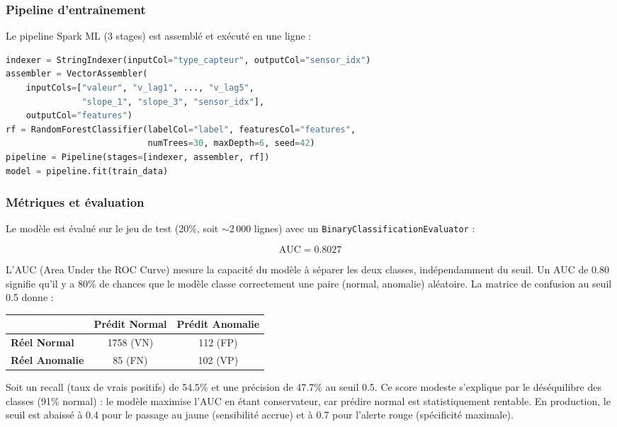 \documentclass[12pt,a4paper]{article}
\begin{document}
\subsubsection{Pipeline d'entraînement}

Le pipeline Spark ML (3 stages) est assemblé et exécuté en une ligne :

\begin{lstlisting}[language=Python,caption={Pipeline d'entraînement (train\_model.py)},label={lst:pipeline}]
indexer = StringIndexer(inputCol="type_capteur", outputCol="sensor_idx")
assembler = VectorAssembler(
    inputCols=["valeur", "v_lag1", ..., "v_lag5",
               "slope_1", "slope_3", "sensor_idx"],
    outputCol="features")
rf = RandomForestClassifier(labelCol="label", featuresCol="features",
                            numTrees=30, maxDepth=6, seed=42)
pipeline = Pipeline(stages=[indexer, assembler, rf])
model = pipeline.fit(train_data)
\end{lstlisting}

\subsubsection{Métriques et évaluation}

Le modèle est évalué sur le jeu de test (20\%, soit $\sim$2\,000 lignes) avec un \texttt{BinaryClassificationEvaluator} :

\[
\text{AUC} = 0.8027
\]

L'AUC (Area Under the ROC Curve) mesure la capacité du modèle à séparer les deux classes, indépendamment du seuil. Un AUC de 0.80 signifie qu'il y a 80\% de chances que le modèle classe correctement une paire (normal, anomalie) aléatoire. La matrice de confusion au seuil 0.5 donne :

\begin{center}
\begin{tabular}{|l|c|c|}
\hline
 & \textbf{Prédit Normal} & \textbf{Prédit Anomalie} \\
\hline
\textbf{Réel Normal} & 1758 (VN) & 112 (FP) \\
\textbf{Réel Anomalie} & 85 (FN) & 102 (VP) \\
\hline
\end{tabular}
\end{center}

Soit un recall (taux de vrais positifs) de 54.5\% et une précision de 47.7\% au seuil 0.5. Ce score modeste s'explique par le déséquilibre des classes (91\% normal) : le modèle maximise l'AUC en étant conservateur, car prédire \og normal \fg{} est statistiquement rentable. En production, le seuil est abaissé à 0.4 pour le passage au jaune (sensibilité accrue) et à 0.7 pour l'alerte rouge (spécificité maximale).
\end{document}

